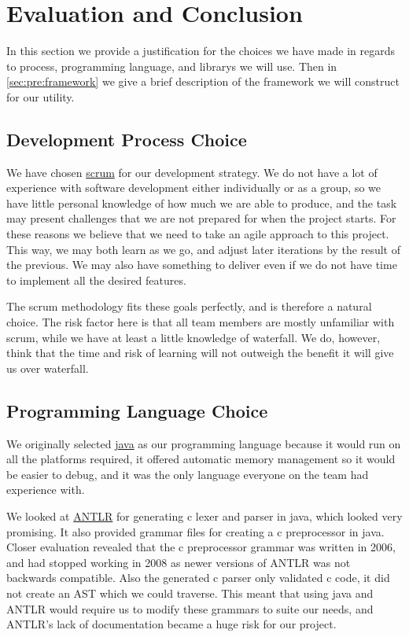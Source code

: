 \section{Evaluation and Conclusion}
\label{sec:pre:eval}
In this section we provide a justification for the choices we have made in
regards to process, programming language, and \glspl{library} we will use. Then
in \autoref{sec:pre:framework} we give a brief description of the framework
we will construct for our \gls{utility}.

\subsection{Development Process Choice}
\label{sec:pre:devchoice}
We have chosen \hyperref[sec:pre:scrum]{\Gls{scrum}} for our development strategy.
We do not have a lot of experience with software development either
individually or as a group, so we have little personal knowledge of how much
we are able to produce, and the task may present challenges that we are not
prepared for when the project starts. For these reasons we believe that we
need to take an agile approach to this project. This way, we may both learn as
we go, and adjust later iterations by the result of the previous. We may also
have something to deliver even if we do not have time to implement all the
desired features.

The \Gls{scrum} methodology fits these goals perfectly, and is therefore a natural
choice. The risk factor here is that all team members are mostly unfamiliar
with \Gls{scrum}, while we have at least a little knowledge of waterfall. We do,
however, think that the time and risk of learning will not outweigh
the benefit it will give us over waterfall.

\subsection{Programming Language Choice}
\label{sec:pre:langchoice}
We originally selected \hyperref[sec:pre:java]{\Gls{java}} as our programming
language because it would run on all the platforms required, it offered
automatic memory management so it would be easier to debug, and it was the only
language everyone on the team had experience with.

We looked at \hyperref[sec:pre:antlr]{ANTLR} for generating
\Gls{c} \gls{lexer} and \gls{parser} in \Gls{java}, which looked very promising. It also provided
grammar files for creating a \Gls{c} \gls{preprocessor} in \Gls{java}. Closer evaluation revealed
that the \Gls{c} \gls{preprocessor} grammar was written in 2006, and had stopped working in
2008 as newer versions of ANTLR was not backwards compatible. Also the
generated \Gls{c} \gls{parser} only validated \Gls{c} code, it did not create an \gls{AST} which we could traverse.
This meant that using \Gls{java} and ANTLR would
require us to modify these grammars to suite our needs, and ANTLR's lack of
documentation became a huge risk for our project.

